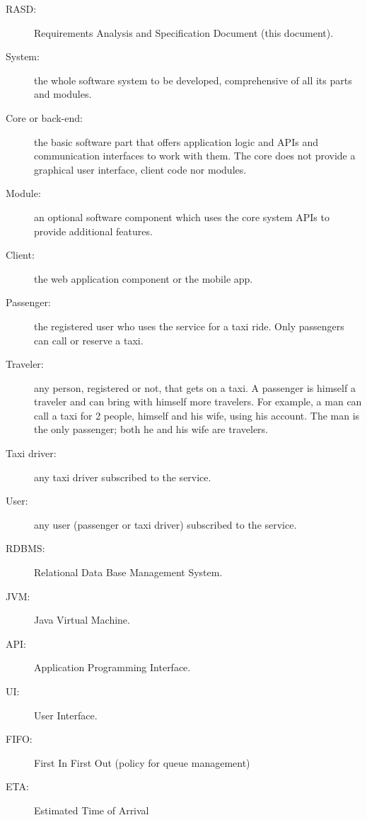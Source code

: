 \begin{description}
\item[RASD:] Requirements Analysis and Specification Document (this document).
\item[System:] the whole software system to be developed, comprehensive of all its parts and modules.
\item[Core or back-end:] the basic software part that offers application logic and APIs and communication interfaces to work with them. The core does not provide a graphical user interface, client code nor modules.
\item[Module:] an optional software component which uses the core system APIs to provide additional features.
\item[Client:] the web application component or the mobile app.
\item[Passenger:] the registered user who uses the service for a taxi ride. Only passengers can call or reserve a taxi.
\item[Traveler:] any person, registered or not, that gets on a taxi. A passenger is himself a traveler and can bring with himself more travelers.
For example, a man can call a taxi for 2 people, himself and his wife, using his account. The man is the only passenger; both he and his wife are travelers.
\item[Taxi driver:] any taxi driver subscribed to the service.
\item[User:] any user (passenger or taxi driver) subscribed to the service.
\item[RDBMS:] Relational Data Base Management System.
\item[JVM:] Java Virtual Machine.
\item[API:] Application Programming Interface.
\item[UI:] User Interface.
\item[FIFO:] First In First Out (policy for queue management)
\item[ETA:] Estimated Time of Arrival
\end{description}
